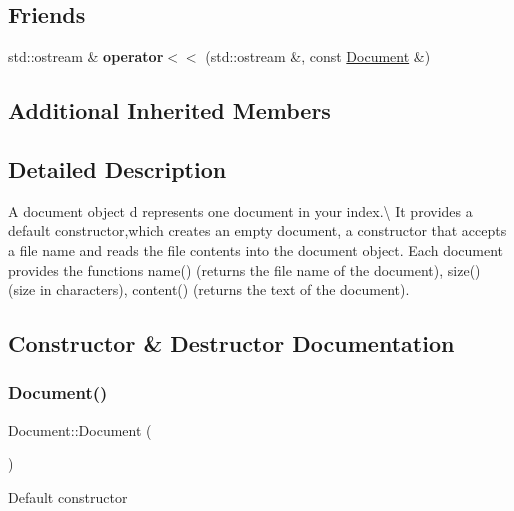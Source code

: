 \subsection*{Friends}
\begin{DoxyCompactItemize}
\item 
\mbox{\label{classDocument_a801e6c851261e550881c632d31407c55}} 
std\+::ostream \& {\bfseries operator$<$$<$} (std\+::ostream \&, const \hyperlink{classDocument}{Document} \&)
\end{DoxyCompactItemize}
\subsection*{Additional Inherited Members}


\subsection{Detailed Description}
A document object d represents one document in your index.\textbackslash{} It provides a default constructor,which creates an empty document, a constructor that accepts a file name and reads the file contents into the document object. Each document provides the functions name() (returns the file name of the document), size() (size in characters), content() (returns the text of the document). 

\subsection{Constructor \& Destructor Documentation}
\mbox{\label{classDocument_acdbcbe550084e8c20f4f67eb229ad66a}} 
\subsubsection{\texorpdfstring{Document()}{Document()}\hspace{0.1cm}{\footnotesize\ttfamily [1/2]}}
{\footnotesize\ttfamily Document\+::\+Document (\begin{DoxyParamCaption}{ }\end{DoxyParamCaption})}

Default constructor \mbox{\label{classDocument_a11e577354c64a23106b0cf34c11e712f}} 
